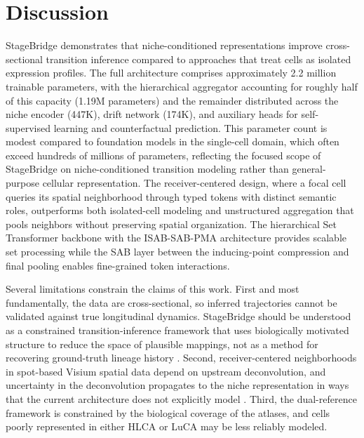\documentclass[conference]{IEEEtran}
\begin{document}
\section{Discussion}

StageBridge demonstrates that niche-conditioned representations improve cross-sectional transition inference compared to approaches that treat cells as isolated expression profiles. The full architecture comprises approximately 2.2 million trainable parameters, with the hierarchical aggregator accounting for roughly half of this capacity (1.19M parameters) and the remainder distributed across the niche encoder (447K), drift network (174K), and auxiliary heads for self-supervised learning and counterfactual prediction. This parameter count is modest compared to foundation models in the single-cell domain, which often exceed hundreds of millions of parameters, reflecting the focused scope of StageBridge on niche-conditioned transition modeling rather than general-purpose cellular representation. The receiver-centered design, where a focal cell queries its spatial neighborhood through typed tokens with distinct semantic roles, outperforms both isolated-cell modeling and unstructured aggregation that pools neighbors without preserving spatial organization. The hierarchical Set Transformer backbone with the ISAB-SAB-PMA architecture provides scalable set processing while the SAB layer between the inducing-point compression and final pooling enables fine-grained token interactions.

Several limitations constrain the claims of this work. First and most fundamentally, the data are cross-sectional, so inferred trajectories cannot be validated against true longitudinal dynamics. StageBridge should be understood as a constrained transition-inference framework that uses biologically motivated structure to reduce the space of plausible mappings, not as a method for recovering ground-truth lineage history \cite{Heitz2025-fx}. Second, receiver-centered neighborhoods in spot-based Visium spatial data depend on upstream deconvolution, and uncertainty in the deconvolution propagates to the niche representation in ways that the current architecture does not explicitly model \cite{Gaspard-Boulinc2025-la}. Third, the dual-reference framework is constrained by the biological coverage of the atlases, and cells poorly represented in either HLCA or LuCA may be less reliably modeled.
\end{document}
